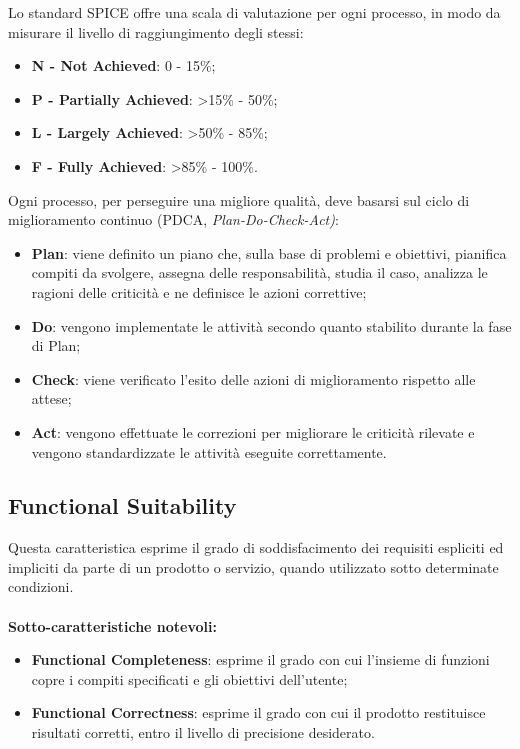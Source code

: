 Lo standard SPICE offre una scala di valutazione per ogni processo, in modo da misurare il livello di raggiungimento degli stessi:
\begin{itemize}
	\item \textbf{N - Not Achieved}: 0 - 15\%;
	\item \textbf{P - Partially Achieved}: >15\% - 50\%;
	\item \textbf{L - Largely Achieved}: >50\% - 85\%;
	\item \textbf{F - Fully Achieved}: >85\% - 100\%.
\end{itemize}
\newpage
{}
Ogni processo, per perseguire una migliore qualità, deve basarsi sul ciclo di miglioramento continuo (PDCA, \emph{Plan-Do-Check-Act)}:
\begin{itemize}
	\item \textbf{Plan}: viene definito un piano che, sulla base di problemi e obiettivi, pianifica compiti da svolgere, assegna delle responsabilità, studia il caso, analizza le ragioni delle criticità e ne definisce le azioni correttive;
	
	\item \textbf{Do}: vengono implementate le attività secondo quanto stabilito durante la fase di Plan;
	
	\item \textbf{Check}: viene verificato l’esito delle azioni di miglioramento rispetto alle attese;
	
	\item \textbf{Act}: vengono effettuate le correzioni per migliorare le criticità rilevate e vengono standardizzate le attività eseguite correttamente.
\end{itemize}
\newpage
{}
\subsection{Functional Suitability}
Questa caratteristica esprime il grado di soddisfacimento dei requisiti espliciti ed impliciti da parte di un prodotto o servizio, quando utilizzato sotto determinate condizioni.\\ \\
\textbf{Sotto-caratteristiche notevoli:}
\begin{itemize}
	\item{\textbf{Functional Completeness}}: esprime il grado con cui l'insieme di funzioni copre i compiti specificati e gli obiettivi dell'utente;
	\item{\textbf{Functional Correctness}}: esprime il grado con cui il prodotto restituisce risultati corretti, entro il livello di precisione desiderato.
\end{itemize}


